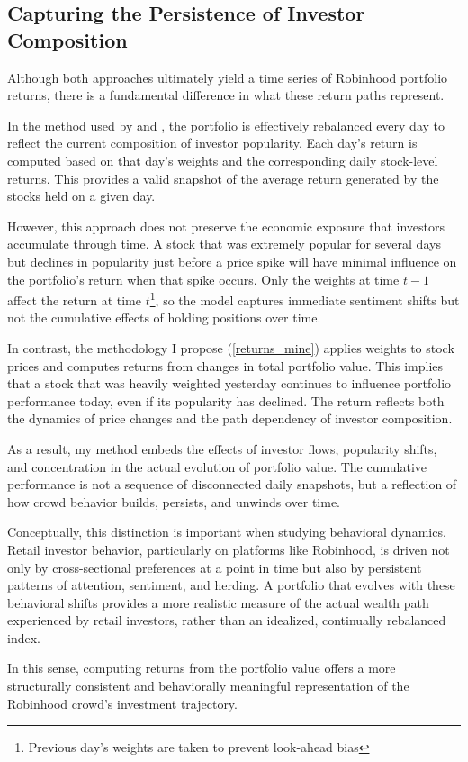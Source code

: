 \subsection{Capturing the Persistence of Investor Composition}
Although both approaches ultimately yield a time series of Robinhood portfolio returns, there is a fundamental difference in what these return paths represent.

In the method used by \cite{Fedyk2024} and \cite{Welch2022}, the portfolio is effectively rebalanced every day to reflect the current composition of investor popularity.
Each day's return is computed based on that day's weights and the corresponding daily stock-level returns.
This provides a valid snapshot of the average return generated by the stocks held on a given day.

However, this approach does not preserve the economic exposure that investors accumulate through time.
A stock that was extremely popular for several days but declines in popularity just before a price spike will have minimal influence on the portfolio's return when that spike occurs.
Only the weights at time $t-1$ affect the return at time $t$\footnote{Previous day's weights are taken to prevent look-ahead bias}, so the model captures immediate sentiment shifts but not the cumulative effects of holding positions over time.

In contrast, the methodology I propose (\ref{returns_mine}) applies weights to stock prices and computes returns from changes in total portfolio value.
This implies that a stock that was heavily weighted yesterday continues to influence portfolio performance today, even if its popularity has declined.
The return reflects both the dynamics of price changes and the path dependency of investor composition.

As a result, my method embeds the effects of investor flows, popularity shifts, and concentration in the actual evolution of portfolio value.
The cumulative performance is not a sequence of disconnected daily snapshots, but a reflection of how crowd behavior builds, persists, and unwinds over time.

Conceptually, this distinction is important when studying behavioral dynamics.
Retail investor behavior, particularly on platforms like Robinhood, is driven not only by cross-sectional preferences at a point in time but also by persistent patterns of attention, sentiment, and herding.
A portfolio that evolves with these behavioral shifts provides a more realistic measure of the actual wealth path experienced by retail investors, rather than an idealized, continually rebalanced index.

In this sense, computing returns from the portfolio value offers a more structurally consistent and behaviorally meaningful representation of the Robinhood crowd's investment trajectory.